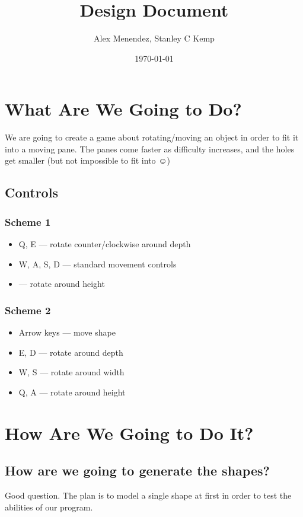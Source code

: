 \documentclass[11pt]{article}
\author{Alex Menendez, Stanley C Kemp}
\date{\today}
\title{Design Document}
\begin{document}
\maketitle

\section{What Are We Going to Do?}
\label{sec:org6ddc32c}
We are going to create a game about rotating/moving an object in
order to fit it into a moving pane. The panes come faster as
difficulty increases, and the holes get smaller (but not impossible
to fit into ☺)

\subsection{Controls}
\label{sec:orgac249ab}

\subsubsection{Scheme 1}
\label{sec:orgeab2c53}
\begin{itemize}
\item Q, E --- rotate counter/clockwise around depth
\item W, A, S, D --- standard movement controls
\item <, > --- rotate around height
\end{itemize}

\subsubsection{Scheme 2}
\label{sec:org9031708}
\begin{itemize}
\item Arrow keys --- move shape
\item E, D --- rotate around depth
\item W, S --- rotate around width
\item Q, A --- rotate around height
\end{itemize}
\section{How Are We Going to Do It?}
\label{sec:org0b47907}
\subsection{How are we going to generate the shapes?}
\label{sec:orgdf8c868}
Good question. The plan is to model a single shape at first in order
to test the abilities of our program. 
\end{document}
